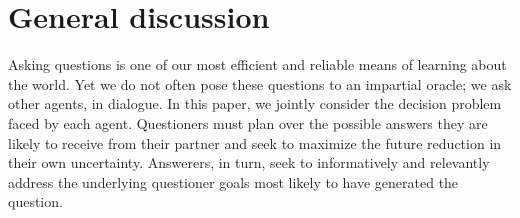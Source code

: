 \documentclass[12pt, floatsintext, jou]{apa6}
\begin{document}

\section{General discussion}
\label{sec:gd}


Asking questions is one of our most efficient and reliable means of learning about the world. Yet we do not often pose these questions to an impartial oracle; we ask other agents, in dialogue. In this paper, we jointly consider the decision problem faced by each agent. Questioners must plan over the possible answers they are likely to receive from their partner and seek to maximize the future reduction in their own uncertainty. Answerers, in turn, seek to informatively and relevantly address the underlying questioner goals most likely to have generated the question. 
\end{document}
